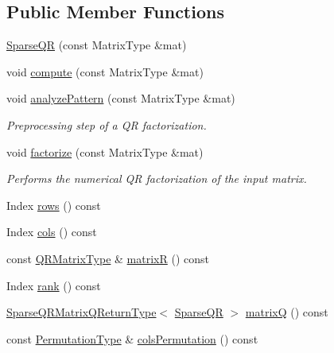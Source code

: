 \subsection*{Public Member Functions}
\begin{DoxyCompactItemize}
\item 
\mbox{\hyperlink{class_eigen_1_1_sparse_q_r_ac50f705d686d4bc687ce6acbc76447d2}{Sparse\+QR}} (const Matrix\+Type \&mat)
\item 
void \mbox{\hyperlink{class_eigen_1_1_sparse_q_r_aedaf52b7543de4d55c58c8f830c2aeb7}{compute}} (const Matrix\+Type \&mat)
\item 
void \mbox{\hyperlink{class_eigen_1_1_sparse_q_r_a4b425ddb1358c914d764cde48853a4f6}{analyze\+Pattern}} (const Matrix\+Type \&mat)
\begin{DoxyCompactList}\small\item\em Preprocessing step of a QR factorization. \end{DoxyCompactList}\item 
void \mbox{\hyperlink{class_eigen_1_1_sparse_q_r_a55a34bacf05bd30a1dacbccad9f03c6d}{factorize}} (const Matrix\+Type \&mat)
\begin{DoxyCompactList}\small\item\em Performs the numerical QR factorization of the input matrix. \end{DoxyCompactList}\item 
Index \mbox{\hyperlink{class_eigen_1_1_sparse_q_r_ab9133b7ace1c19714df99f553666316d}{rows}} () const
\item 
Index \mbox{\hyperlink{class_eigen_1_1_sparse_q_r_a57bedc9b1351c0995bae8ad0088a6fce}{cols}} () const
\item 
const \mbox{\hyperlink{class_eigen_1_1_sparse_matrix}{Q\+R\+Matrix\+Type}} \& \mbox{\hyperlink{class_eigen_1_1_sparse_q_r_a564524ff13b2b6dd1e76127404f7b920}{matrixR}} () const
\item 
Index \mbox{\hyperlink{class_eigen_1_1_sparse_q_r_a70ec2b9e5cb62a41dc1ee2adfb54e9b0}{rank}} () const
\item 
\mbox{\hyperlink{struct_eigen_1_1_sparse_q_r_matrix_q_return_type}{Sparse\+Q\+R\+Matrix\+Q\+Return\+Type}}$<$ \mbox{\hyperlink{class_eigen_1_1_sparse_q_r}{Sparse\+QR}} $>$ \mbox{\hyperlink{class_eigen_1_1_sparse_q_r_ae1cc0a836c177d4f42600f8639354be1}{matrixQ}} () const
\item 
const \mbox{\hyperlink{class_eigen_1_1_permutation_matrix}{Permutation\+Type}} \& \mbox{\hyperlink{class_eigen_1_1_sparse_q_r_a140930ebbf89dfd57a173761716db38f}{cols\+Permutation}} () const

\end{DoxyCompactItemize}
